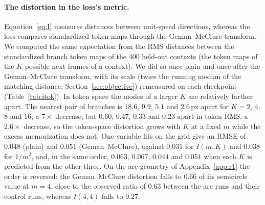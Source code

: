 \paragraph{The distortion in the loss's metric.} Equation~\ref{eq:I} measures distances between unit-speed directions, whereas the loss compares standardized token maps through the Geman--McClure transform. We computed the same expectation from the RMS distances between the standardized branch token maps of the 400 held-out contexts (the token maps of the $K$ possible next frames of a context). We did so once plain and once after the Geman--McClure transform, with its scale (twice the running median of the matching distance; Section~\ref{sec:objective}) remeasured on each checkpoint (Table~\ref{tab:itok}). In token space the modes of a larger $K$ are relatively farther apart. The nearest pair of branches is $18.6$, $9.9$, $5.1$ and $2.6$\,px apart for $K = 2$, $4$, $8$ and $16$, a $7\times$ decrease, but $0.60$, $0.47$, $0.33$ and $0.23$ apart in token RMS, a $2.6\times$ decrease, so the token-space distortion grows with $K$ at a fixed $m$ while the excess memorization does not. One-variable fits on the grid give an RMSE of $0.048$ (plain) and $0.051$ (Geman--McClure), against $0.031$ for $I(m,K)$ and $0.038$ for $1/m^2$, and, in the same order, $0.063$, $0.067$, $0.044$ and $0.051$ when each $K$ is predicted from the other three. On the arc geometry of Appendix~\ref{app:r1} the order is reversed: the Geman--McClure distortion falls to $0.66$ of its semicircle value at $m{=}4$, close to the observed ratio of $0.63$ between the arc runs and their control runs, whereas $I(4,4)$ falls to $0.27$.

